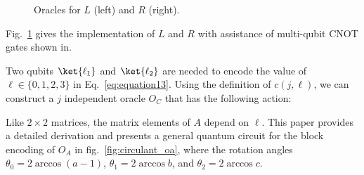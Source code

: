 \documentclass{article}
\begin{document}
    \begin{figure}[htbp]
        \centering
        \caption{Oracles for $L$ (left) and $R$ (right).}
        \label{fig:circulant_lr}
    \end{figure}

    Fig.~\ref{fig:circulant_lr} gives the implementation of $L$ and $R$ with assistance of multi-qubit CNOT gates shown in.

    Two qubits $\ket{\ell_1}$ and $\ket{\ell_2}$ are needed to encode the value of $\ell \in \{0,1,2,3\}$ in Eq.~\eqref{eq:equation13}. Using the definition of $c(j, \ell)$, we can construct a $j$ independent oracle $O_C$ that has the following action:

    Like $2\times2$ matrices, the matrix elements of $A$ depend on $\ell$. This paper provides a detailed derivation and presents a general quantum circuit for the block encoding of $O_A$ in fig.~\ref{fig:circulant_oa}, where the rotation angles $\theta_0 = 2\arccos (a-1)$, $\theta_1 = 2\arccos b$, and $\theta_2 = 2\arccos c$.
\end{document}
